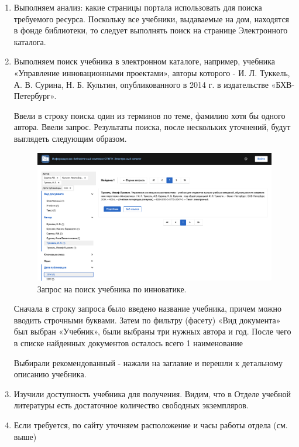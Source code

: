 \documentclass[14pt,a4paper,report]{report}
\begin{document}
\begin{enumerate}
\item Выполняем анализ: какие страницы портала использовать для поиска требуемого ресурса. Поскольку все учебники, выдаваемые на дом, находятся в фонде библиотеки, то следует выполнять поиск на странице Электронного каталога.

\item Выполняем поиск учебника в электронном каталоге, например, учебника «Управление инновационными проектами», авторы которого - И. Л. Туккель, А. В. Сурина, Н. Б. Культин, опубликованного в 2014 г. в издательстве «БХВ-Петербург».

Ввели в строку поиска один из терминов по теме, фамилию хотя бы одного автора. Ввели запрос. Результаты поиска, после нескольких уточнений, будут выглядеть следующим образом.

\begin{figure}[h!]
\centering
\includegraphics[scale = 0.33]{131.png}
\caption{Запрос на поиск учебника по инноватике.}
\label{image:1}
\end{figure}

Сначала в строку запроса было введено название учебника, причем можно вводить строчными буквами. Затем по фильтру (фасету) «Вид документа» был выбран «Учебник», были выбраны три нужных автора и год. После чего в списке найденных документов осталось всего 1 наименование

Выбирали рекомендованный - нажали на заглавие и перешли к детальному описанию учебника.

\item Изучили доступность учебника для получения. Видим, что в Отделе учебной литературы есть достаточное количество свободных экземпляров.

\item  Если требуется, по сайту уточняем расположение и часы работы отдела (см. выше)
\end{enumerate}
\end{document}

